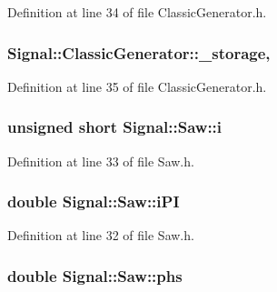 Definition at line 34 of file Classic\+Generator.\+h.

\hypertarget{class_signal_1_1_classic_generator_a1214faf589eccb01631700723900bbf9}{
\subsubsection[{\+\_\+storage}]{ Signal\+::\+Classic\+Generator\+::\+\_\+storage\hspace{0.3cm}{\ttfamily [protected]}, {\ttfamily [inherited]}}}\label{class_signal_1_1_classic_generator_a1214faf589eccb01631700723900bbf9}


Definition at line 35 of file Classic\+Generator.\+h.

\hypertarget{class_signal_1_1_saw_a50612c8009e428dccb3e4b3b798bdf3d}{
\subsubsection[{i}]{\setlength{\rightskip}{0pt plus 5cm}unsigned short Signal\+::\+Saw\+::i\hspace{0.3cm}{\ttfamily [protected]}}}\label{class_signal_1_1_saw_a50612c8009e428dccb3e4b3b798bdf3d}


Definition at line 33 of file Saw.\+h.

\hypertarget{class_signal_1_1_saw_a75052e172f2d3c7ffc8daae2988f7305}{
\subsubsection[{i\+P\+I}]{\setlength{\rightskip}{0pt plus 5cm}double Signal\+::\+Saw\+::i\+P\+I\hspace{0.3cm}{\ttfamily [protected]}}}\label{class_signal_1_1_saw_a75052e172f2d3c7ffc8daae2988f7305}


Definition at line 32 of file Saw.\+h.

\hypertarget{class_signal_1_1_saw_a96d64ea69f7930c8d7640ecd6944dc84}{
\subsubsection[{phs}]{\setlength{\rightskip}{0pt plus 5cm}double Signal\+::\+Saw\+::phs\hspace{0.3cm}{\ttfamily [protected]}}}\label{class_signal_1_1_saw_a96d64ea69f7930c8d7640ecd6944dc84}


